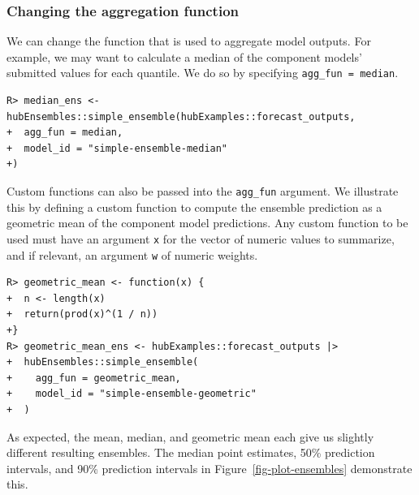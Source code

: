 \documentclass[
  article,
  shortnames,
  notitle]{jss}
\begin{document}
\begin{longtable}[]
\caption{\label{tbl-mean-ensemble}Mean ensemble model output. The values
in the \texttt{model\_id} column are determined by the argument
\texttt{simple\_ensemble(...,\ model\_id\ =\ )}. A subset of ensemble
model output is shown: 1-week ahead pmf forecasts made on 2022-12-17 for
Massachusetts. Results are generated for all output types. Here, we show
only the median and 50\% prediction interval for the quantile output
type and all bins for the pmf output type. The \texttt{location},
\texttt{reference\_date} and \texttt{target\_end\_date} columns have
been omitted for brevity, and the \texttt{value} column is rounded to
two digits.}

\tabularnewline
\end{longtable}

\subsubsection{Changing the aggregation
function}\label{changing-the-aggregation-function}

We can change the function that is used to aggregate model outputs. For
example, we may want to calculate a median of the component models'
submitted values for each quantile. We do so by specifying
\texttt{agg\_fun\ =\ median}.

\begin{verbatim}
R> median_ens <- hubEnsembles::simple_ensemble(hubExamples::forecast_outputs,
+  agg_fun = median,
+  model_id = "simple-ensemble-median"
+)
\end{verbatim}

Custom functions can also be passed into the \texttt{agg\_fun} argument.
We illustrate this by defining a custom function to compute the ensemble
prediction as a geometric mean of the component model predictions. Any
custom function to be used must have an argument \texttt{x} for the
vector of numeric values to summarize, and if relevant, an argument
\texttt{w} of numeric weights.

\begin{verbatim}
R> geometric_mean <- function(x) {
+  n <- length(x)
+  return(prod(x)^(1 / n))
+}
R> geometric_mean_ens <- hubExamples::forecast_outputs |>
+  hubEnsembles::simple_ensemble(
+    agg_fun = geometric_mean,
+    model_id = "simple-ensemble-geometric"
+  )
\end{verbatim}

As expected, the mean, median, and geometric mean each give us slightly
different resulting ensembles. The median point estimates, 50\%
prediction intervals, and 90\% prediction intervals in
Figure~\ref{fig-plot-ensembles} demonstrate this.
\end{document}
